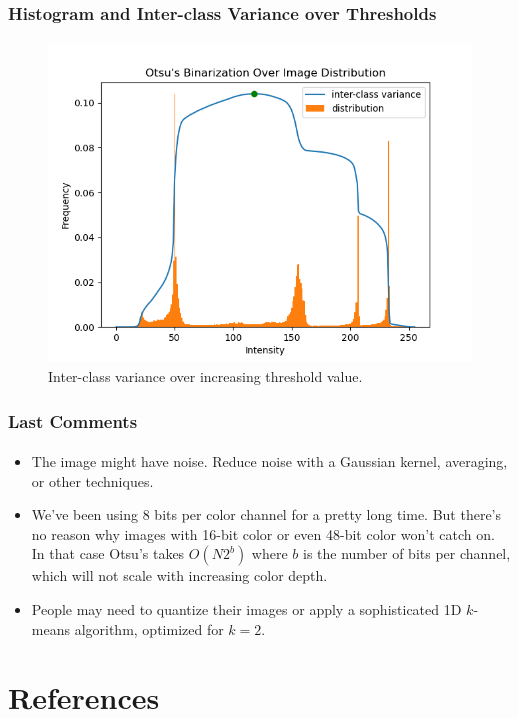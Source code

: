 \documentclass{beamer}                             %
\begin{document}
\begin{frame}
\frametitle{Histogram and Inter-class Variance over Thresholds}
\framesubtitle{}
\begin{figure}[h!]
  \centering
  \includegraphics[scale=0.50]{histogram}
  \caption{Inter-class variance over increasing threshold value.}
\end{figure}
\end{frame}

\begin{frame}
\frametitle{Last Comments}
\framesubtitle{}
\begin{itemize}
  \item The image might have noise. Reduce noise with
    a Gaussian kernel, averaging, or other techniques.
  \item We've been using 8 bits per color channel for a pretty long time.
    But there's no reason why images with 16-bit color or even 48-bit
    color won't catch on. In that case Otsu's takes \( O(N 2^b) \)
    where \( b \) is the number of bits per channel, which will not
    scale with increasing color depth.
  \item People may need to quantize their images or apply a
    sophisticated 1D \( k \)-means algorithm, optimized for \( k = 2 \).
\end{itemize}
\end{frame}

\section{References}
\end{document}
